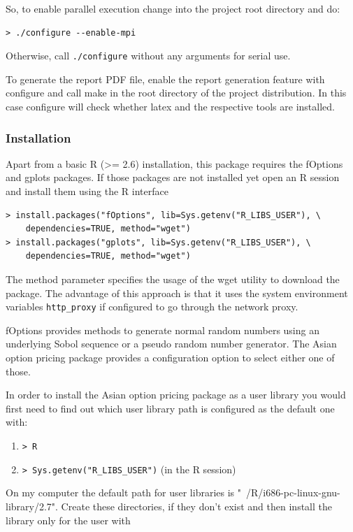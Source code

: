 \documentclass[12pt,a4paper]{article}
\begin{document}
So, to enable parallel execution change into the project root
directory and do:
\begin{verbatim}
> ./configure --enable-mpi
\end{verbatim}

Otherwise, call \verb=./configure= without any arguments for serial
use.

To generate the report PDF file, enable the report generation feature
with configure and call make in the root directory of the project
distribution. In this case configure will check whether latex and the
respective tools are installed.

\subsubsection{Installation}
\label{sec:installation}

Apart from a basic R (>= 2.6) installation, this package requires the
fOptions and gplots packages. If those packages are not installed yet
open an R session and install them using the R interface

\begin{verbatim}
> install.packages("fOptions", lib=Sys.getenv("R_LIBS_USER"), \
    dependencies=TRUE, method="wget")
> install.packages("gplots", lib=Sys.getenv("R_LIBS_USER"), \
    dependencies=TRUE, method="wget")
\end{verbatim}

The method parameter specifies the usage of the wget utility to
download the package. The advantage of this approach is that it uses
the system environment variables \verb=http_proxy= if configured to go
through the network proxy.

fOptions provides methods to generate normal random numbers using an
underlying Sobol sequence or a pseudo random number generator. The
Asian option pricing package provides a configuration option to select
either one of those.

In order to install the Asian option pricing package as a user
library you would first need to find out which user library path is
configured as the default one with:

\begin{enumerate}
\item \verb=> R=
\item \verb=> Sys.getenv("R_LIBS_USER")= (in the R session)
\end{enumerate}

On my computer the default path for user libraries is
"~/R/i686-pc-linux-gnu-library/2.7". Create these directories, if they
don't exist and then install the library only for the user with
\end{document}

